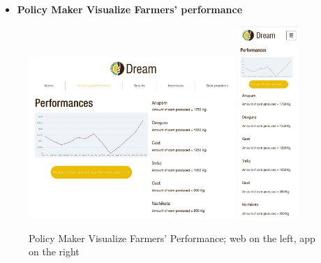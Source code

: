 \documentclass{article}
\begin{document}
    
    \begin{itemize}
        \item \textbf{Policy Maker Visualize Farmers' performance}
    \end{itemize}
        \begin{figure} [h]
            \centering
            \includegraphics[width=0.7\textwidth]{images/UserInterfaces/PolicyMaker/FarmersPerformance/FarmersPerformanceWeb.png}
            \quad
            \includegraphics[width=0.2\textwidth]{images/UserInterfaces/PolicyMaker/FarmersPerformance/FarmersPerformanceApp.png}
            \quad
            \caption{\label{fig:policyMakerVisualizeFarmers}Policy Maker Visualize Farmers' Performance; web on the left, app on the right}
        \end{figure}
        \newpage
\end{document}
